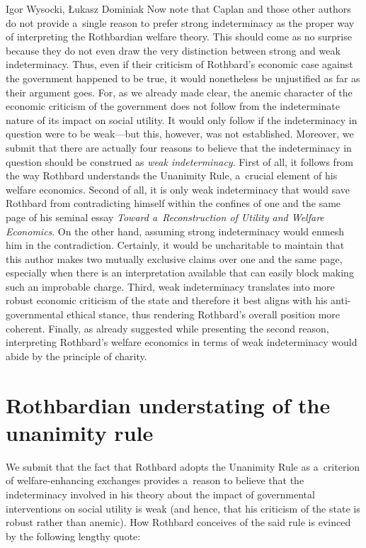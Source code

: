 \begin{artengenv}{Igor Wysocki, Łukasz Dominiak}
Now note that Caplan and those other authors do not provide a~single reason to prefer strong indeterminacy as the proper way of interpreting the Rothbardian welfare theory. This should come as no surprise because they do not even draw the very distinction between strong and weak indeterminacy. Thus, even if their criticism of Rothbard's economic case against the government happened to be true, it would nonetheless be unjustified as far as their argument goes. For, as we already made clear, the anemic character of the economic criticism of the government does not follow from the indeterminate nature of its impact on social utility. It would only follow if the indeterminacy in question were to be weak---but this, however, was not established. Moreover, we submit that there are actually four reasons to believe that the indeterminacy in question should be construed as \textit{weak indeterminacy}. First of all, it follows from the way Rothbard understands the Unanimity Rule, a~crucial element of his welfare economics. Second of all, it is only weak indeterminacy that would save Rothbard from contradicting himself within the confines of one and the same page of his seminal essay \textit{Toward a~Reconstruction of Utility and Welfare Economics}. On the other hand, assuming strong indeterminacy would enmesh him in the contradiction. Certainly, it would be uncharitable to maintain that this author makes two mutually exclusive claims over one and the same page, especially when there is an interpretation available that can easily block making such an improbable charge. Third, weak indeterminacy translates into more robust economic criticism of the state and therefore it best aligns with his anti-governmental ethical stance, thus rendering Rothbard's overall position more coherent. Finally, as already suggested while presenting the second reason, interpreting Rothbard's welfare economics in terms of weak indeterminacy would abide by the principle of charity.



\section{Rothbardian understating of the unanimity rule}

We submit that the fact that Rothbard adopts the Unanimity Rule as a~criterion of welfare-enhancing exchanges provides a~reason to believe that the indeterminacy involved in his theory about the impact of governmental interventions on social utility is weak (and hence, that his criticism of the state is robust rather than anemic). How Rothbard conceives of the said rule is evinced by the following lengthy quote:




\end{artengenv}
